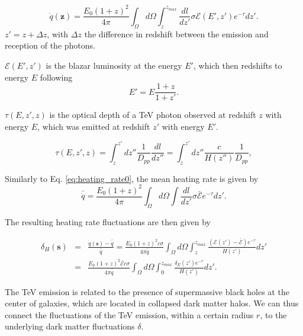 \documentclass[twocolumns]{emulateapj}
\begin{document}
\begin{equation}
  \label{eq:int_exp_heat}
  \dot{q}(\mathbf{z})=\frac{E_0(1+z)^2}{4\pi}\int_{\Omega}d\Omega\int_z^{z_{max}}\frac{dl}{dz'}\sigma\mathcal{E}(E',z') e^{-\tau} dz'.
\end{equation}
 $z'=z+\Delta z$, with $\Delta z$ the difference in redshift between the emission and reception of the photons.

$\mathcal{E}(E',z')$ is  the   blazar luminosity at the energy $E'$,  which then redshifts to energy $E$ following 
\begin{equation}
  \label{eq:E_z}
  E'=E\frac{1+z}{1+z'}.
\end{equation}

$\tau(E,z',z)$ is the optical depth of a TeV photon observed at redshift $z$ with energy $E$, which was emitted at redshift $z'$ with energy $E'$.

\begin{equation}
  \label{eq:tau}
  \tau(E,z',z)=\int_z^{z'}dz''\frac{1}{D_{pp}}\frac{dl}{dz''}=\int_z^{z'}dz''\frac{c}{H(z'')}\frac{1}{D_{pp}},
\end{equation}



Similarly to Eq. \ref{eq:heating_rate0},  the mean heating rate is given by 
\begin{equation}
  \label{eq:mean_exp_heat}
  \bar{\dot{q}}=\frac{E_0(1+z)^2}{4\pi}\int_{\Omega}d\Omega\int \frac{dl}{dz'}\sigma\bar{\mathcal{E}} e^{-\tau}dz'.
\end{equation}

The resulting heating rate fluctuations are then given by

\begin{eqnarray}
  \label{eq:fluc_exp0}
  \delta_H(\mathbf{s})&=&\frac{\dot{q}(\mathbf{s})-\bar{\dot{q}}}{\bar{\dot{q}}}=\frac{E_0(1+z)^2c\sigma}{4\pi\bar{\dot{q}}} \int_{\Omega}d\Omega\int_z^{z_{max}} \frac{ ( \mathcal{E}(z')-\bar{\mathcal{E}})  e^{-\tau}}{H(z')} dz' \\ \nonumber
  &=&\frac{E_0(1+z)^2\bar{\mathcal{E}} c\sigma}{4\pi\bar{\dot{q}}}  \int_{\Omega}d\Omega\int_0^{z_{max}}   \frac{\delta_E(z')  e^{-\tau}}{H(z')}dz'.
\end{eqnarray}

The TeV emission is related to the presence of supermassive black holes at the center of galaxies, which are located in collapsed dark matter halos.  We can thus connect the fluctuations of the TeV emission, within a certain radius $r$, to the underlying dark matter fluctuations $\delta$.
\end{document}

